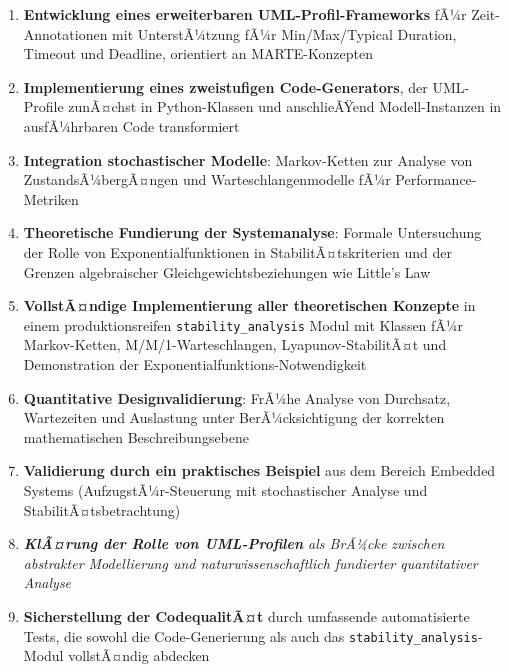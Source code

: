 ﻿\documentclass[a4paper,12pt]{scrreprt}
\theoremstyle{definition}
\begin{document}
\begin{enumerate}
	\item[-] \textbf{Entwicklung eines erweiterbaren UML-Profil-Frameworks} fÃ¼r Zeit-Anno\-tationen mit UnterstÃ¼tzung fÃ¼r Min/Max/Typical Duration, Timeout und Deadline, orientiert an MARTE-Konzepten
	
	\item[-] \textbf{Implementierung eines zweistufigen Code-Generators}, der UML-Profile zu\-nÃ¤chst in Python-Klassen und anschlieÃŸend Modell-Instanzen in ausfÃ¼hrbaren Code transformiert
	
	\item[-] \textbf{Integration stochastischer Modelle}: Markov-Ketten zur Analyse von Zustands\-Ã¼bergÃ¤ngen und Warteschlangenmodelle fÃ¼r Performance-Metriken
	
	\item[-] \textbf{Theoretische Fundierung der Systemanalyse}: Formale Untersuchung der Rolle von Exponentialfunktionen in StabilitÃ¤tskriterien und der Grenzen algebraischer Gleichgewichtsbeziehungen wie Little's Law
	
	\item[-] \textbf{VollstÃ¤ndige Implementierung aller theoretischen Konzepte} in einem produktionsreifen \texttt{stability\_analysis} Modul mit Klassen fÃ¼r Markov-Ketten, M/M/1-Warteschlangen, Lyapunov-StabilitÃ¤t und Demonstration der Exponentialfunktions-Notwendigkeit
	
	\item[-] \textbf{Quantitative Designvalidierung}: FrÃ¼he Analyse von Durchsatz, Wartezeiten und Auslastung unter BerÃ¼cksichtigung der korrekten mathematischen Beschreibungsebene
	
	\item[-] \textbf{Validierung durch ein praktisches Beispiel} aus dem Bereich Embedded Systems (AufzugstÃ¼r-Steuerung mit stochastischer Analyse und StabilitÃ¤tsbetrachtung)
	
	\item[-] \textit{\textbf{KlÃ¤rung der Rolle von UML-Profilen} als BrÃ¼cke zwischen abstrakter Modellierung und naturwissenschaftlich fundierter quantitativer Analyse}
	
    \item[-] \textbf{Sicherstellung der CodequalitÃ¤t} durch umfassende
	automatisierte Tests, die sowohl die Code-Generierung als auch
	das \texttt{stability\_analysis}-Modul vollstÃ¤ndig abdecken
\end{enumerate}
\end{document}
